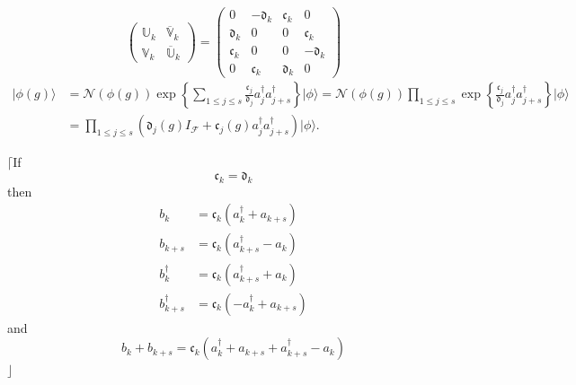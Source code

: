 \documentclass[aps, preprint]{revtex4}
\begin{document}
\begin{equation}\left (\begin{array}{cc}\mathbb{U}_{k} & \overline{\mathbb{V}}_{k} \\
\mathbb{V}_{k} & \overline{\mathbb{U}}_{k}\end{array}\right ) =\left (\begin{array}{cccc}0 &  -\mathfrak{d}_{k} & \mathfrak{c}_{k} & 0 \\
\mathfrak{d}_{k} & 0 & 0 & \mathfrak{c}_{k} \\
\mathfrak{c}_{k} & 0 & 0 &  -\mathfrak{d}_{k} \\
0 & \mathfrak{c}_{k} & \mathfrak{d}_{k} & 0\end{array}\right )
\end{equation}
\begin{align}\vert \phi  \left (g\right ) \rangle  &  =\mathcal{N} \left (\phi  \left (g\right )\right ) \exp  \left \{\sum _{1 \leq j \leq s}\frac{\mathfrak{c}_{j}}{\mathfrak{d}_{j}} a_{j}^{ \dag } a_{j +s}^{ \dag }\right \}\vert \phi  \rangle  =\mathcal{N} \left (\phi  \left (g\right )\right ) {\displaystyle\prod _{1 \leq j \leq s}}\exp  \left \{\frac{\mathfrak{c}_{j}}{\mathfrak{d}_{j}} a_{j}^{ \dag } a_{j +s}^{ \dag }\right \}\vert \phi  \rangle  \\
 &  ={\displaystyle\prod _{1 \leq j \leq s}}\left (\mathfrak{d}_{j} \left (g\right ) I_{\mathcal{F}} +\mathfrak{c}_{j} \left (g\right ) a_{j}^{ \dag } a_{j +s}^{ \dag }\right )\vert \phi  \rangle \text{.}\end{align}

$\lceil $If
\begin{equation*}\mathfrak{c}_{k} =\mathfrak{d}_{k}
\end{equation*}then
\begin{align}b_{k} &  =\mathfrak{c}_{k} \left (a_{k}^{ \dag } +a_{k +s}\right ) \nonumber  \\
b_{k +s} &  =\mathfrak{c}_{k} \left (a_{k +s}^{ \dag } -a_{k}\right ) \nonumber  \\
b_{k}^{ \dag } &  =\mathfrak{c}_{k} \left (a_{k +s}^{ \dag } +a_{k}\right ) \nonumber  \\
b_{k +s}^{ \dag } &  =\mathfrak{c}_{k} \left ( -a_{k}^{ \dag } +a_{k +s}\right )\end{align}and
\begin{equation*}b_{k} +b_{k +s} =\mathfrak{c}_{k} \left (a_{k}^{ \dag } +a_{k +s} +a_{k +s}^{ \dag } -a_{k}\right )
\end{equation*}$\rfloor $ 
\end{document}
